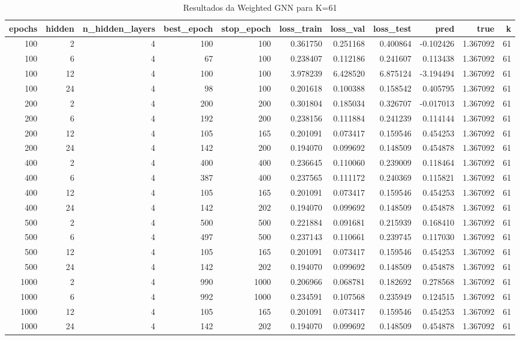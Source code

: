 \begin{table}
\caption{Resultados da Weighted GNN para K=61}
\label{tab:weighted_gnn_results_k61}
\begin{tabular}{rrrrrrrrrrr}
\toprule
epochs & hidden & n\_hidden\_layers & best\_epoch & stop\_epoch & loss\_train & loss\_val & loss\_test & pred & true & k \\
\midrule
100 & 2 & 4 & 100 & 100 & 0.361750 & 0.251168 & 0.400864 & -0.102426 & 1.367092 & 61 \\
100 & 6 & 4 & 67 & 100 & 0.238407 & 0.112186 & 0.241607 & 0.113438 & 1.367092 & 61 \\
100 & 12 & 4 & 100 & 100 & 3.978239 & 6.428520 & 6.875124 & -3.194494 & 1.367092 & 61 \\
100 & 24 & 4 & 98 & 100 & 0.201618 & 0.100388 & 0.158542 & 0.405795 & 1.367092 & 61 \\
200 & 2 & 4 & 200 & 200 & 0.301804 & 0.185034 & 0.326707 & -0.017013 & 1.367092 & 61 \\
200 & 6 & 4 & 192 & 200 & 0.238156 & 0.111884 & 0.241239 & 0.114144 & 1.367092 & 61 \\
200 & 12 & 4 & 105 & 165 & 0.201091 & 0.073417 & 0.159546 & 0.454253 & 1.367092 & 61 \\
200 & 24 & 4 & 142 & 200 & 0.194070 & 0.099692 & 0.148509 & 0.454878 & 1.367092 & 61 \\
400 & 2 & 4 & 400 & 400 & 0.236645 & 0.110060 & 0.239009 & 0.118464 & 1.367092 & 61 \\
400 & 6 & 4 & 387 & 400 & 0.237565 & 0.111172 & 0.240369 & 0.115821 & 1.367092 & 61 \\
400 & 12 & 4 & 105 & 165 & 0.201091 & 0.073417 & 0.159546 & 0.454253 & 1.367092 & 61 \\
400 & 24 & 4 & 142 & 202 & 0.194070 & 0.099692 & 0.148509 & 0.454878 & 1.367092 & 61 \\
500 & 2 & 4 & 500 & 500 & 0.221884 & 0.091681 & 0.215939 & 0.168410 & 1.367092 & 61 \\
500 & 6 & 4 & 497 & 500 & 0.237143 & 0.110661 & 0.239745 & 0.117030 & 1.367092 & 61 \\
500 & 12 & 4 & 105 & 165 & 0.201091 & 0.073417 & 0.159546 & 0.454253 & 1.367092 & 61 \\
500 & 24 & 4 & 142 & 202 & 0.194070 & 0.099692 & 0.148509 & 0.454878 & 1.367092 & 61 \\
1000 & 2 & 4 & 990 & 1000 & 0.206966 & 0.068781 & 0.182692 & 0.278568 & 1.367092 & 61 \\
1000 & 6 & 4 & 992 & 1000 & 0.234591 & 0.107568 & 0.235949 & 0.124515 & 1.367092 & 61 \\
1000 & 12 & 4 & 105 & 165 & 0.201091 & 0.073417 & 0.159546 & 0.454253 & 1.367092 & 61 \\
1000 & 24 & 4 & 142 & 202 & 0.194070 & 0.099692 & 0.148509 & 0.454878 & 1.367092 & 61 \\
\bottomrule
\end{tabular}
\end{table}
